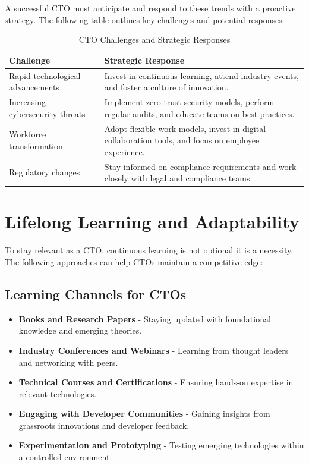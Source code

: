A successful CTO must anticipate and respond to these trends with a proactive strategy. The following table outlines key challenges and potential responses:

\begin{table}[ht]
    \centering
    \begin{tabular}{|p{5cm}|p{10cm}|}
        \hline
        \textbf{Challenge}               & \textbf{Strategic Response}                                                                          \\
        \hline
        Rapid technological advancements & Invest in continuous learning, attend industry events, and foster a culture of innovation.           \\
        \hline
        Increasing cybersecurity threats & Implement zero-trust security models, perform regular audits, and educate teams on best practices.   \\
        \hline
        Workforce transformation         & Adopt flexible work models, invest in digital collaboration tools, and focus on employee experience. \\
        \hline
        Regulatory changes               & Stay informed on compliance requirements and work closely with legal and compliance teams.           \\
        \hline
    \end{tabular}
    \caption{CTO Challenges and Strategic Responses}
\end{table}

\section{Lifelong Learning and Adaptability}

To stay relevant as a CTO, continuous learning is not optional \textemdash{} it is a necessity. The following approaches can help CTOs maintain a competitive edge:

\subsection{Learning Channels for CTOs}

\begin{itemize}
    \item \textbf{Books and Research Papers} - Staying updated with foundational knowledge and emerging theories.
    \item \textbf{Industry Conferences and Webinars} - Learning from thought leaders and networking with peers.
    \item \textbf{Technical Courses and Certifications} - Ensuring hands-on expertise in relevant technologies.
    \item \textbf{Engaging with Developer Communities} - Gaining insights from grassroots innovations and developer feedback.
    \item \textbf{Experimentation and Prototyping} - Testing emerging technologies within a controlled environment.
\end{itemize}

